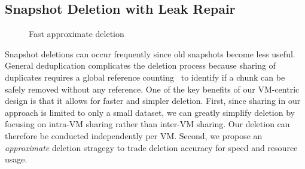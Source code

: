 
\subsection{Snapshot Deletion with Leak Repair}
\label{sect:delete}


\begin{figure}[htbp]
  \centering
  \caption{Fast approximate deletion}
  \label{fig:deletion_flow}
\end{figure}

Snapshot deletions can occur frequently since old snapshots become less useful.
General deduplication complicates the deletion process because sharing of duplicates
requires a global reference counting~\cite{Guo2011,Fabiano2013} 
 to identify if  a chunk can be  safely removed without any reference.
One of the key benefits of our VM-centric design is that it allows for faster and simpler deletion. First, since
sharing in our approach is limited to only a small dataset, we can greatly simplify deletion by focusing
on intra-VM sharing rather than inter-VM sharing. Our deletion can therefore be conducted independently per VM.
Second, we propose an {\em approximate} deletion stragegy to trade deletion accuracy for speed and
resource usage.

